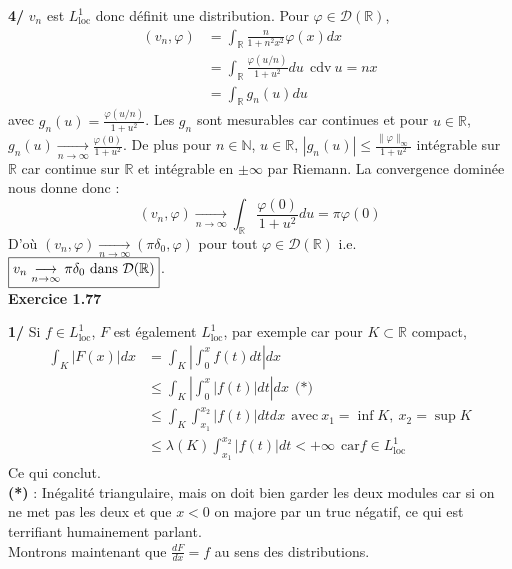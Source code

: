 \documentclass[a4paper,12pt]{article}
\begin{document}
\textbf{4/} $v_n$ est $L^1_{\text{loc}}$ donc définit une distribution. Pour $\varphi \in \mathcal{D}(\mathbb{R})$,
\begin{align*}
     (v_n, \varphi) & = \int_{\mathbb{R}} \frac{n}{1+n^2 x^2} \varphi(x) dx \\
     & = \int_{\mathbb{R}}  \frac{\varphi(u/n)}{1+u^2} du \ \ \text{cdv} \ u=nx \\ 
     & = \int_{\mathbb{R}} g_n(u) du
\end{align*}
avec $g_n(u) = \frac{\varphi(u/n)}{1+u^2}$. Les $g_n$ sont mesurables car continues et pour $u \in \mathbb{R}$, $g_n(u) \underset{n \to \infty}{\longrightarrow} \frac{\varphi(0)}{1+u^2}$. De plus pour $n \in \mathbb{N}$, $u \in \mathbb{R}$, $|g_n(u)| \leq \frac{\| \varphi \|_{\infty}}{1+u^2}$ intégrable sur $\mathbb{R}$ car continue sur $\mathbb{R}$ et intégrable en $\pm \infty$ par Riemann. La convergence dominée nous donne donc :
$$\boxed{(v_n, \varphi) \underset{n \to \infty}{\longrightarrow} \int_{\mathbb{R}} \frac{\varphi(0)}{1+u^2} du  = \pi \varphi(0)}$$
D'où $(v_n, \varphi) \underset{n \to \infty}{\longrightarrow} (\pi \delta_0, \varphi)$ pour tout $\varphi \in \mathcal{D}(\mathbb{R})$ i.e. $\boxed{v_n \underset{n \to \infty}{\longrightarrow} \pi \delta_0$ dans $\mathcal{D}(\mathbb{R)}}$. \\

\textbf{Exercice 1.77}

\textbf{1/} Si $f \in L^1_{\text{loc}}$, $F$ est également $L^1_{\text{loc}}$, par exemple car pour $K \subset \mathbb{R}$ compact,
\begin{align*}
     \int_K |F(x)| dx  & = \int_K \left| \int_{0}^x f(t)dt \right| dx \\
     & \leq \int_K \left| \int_0^x |f(t)| dt \right| dx \ \ \textbf{(*)} \\
     & \leq  \int_K \int_{x_1}^{x_2} |f(t)| dt dx \ \ \text{avec} \  x_1 = \inf K, \ x_2 = \sup K \\
     & \boxed{\leq \lambda(K) \int_{x_1}^{x_2} |f(t)| dt < + \infty} \ \ \text{car} f\in L^1_{\text{loc}}
\end{align*}
Ce qui conclut. \\

\textbf{(*)} : Inégalité triangulaire, mais on doit bien garder les deux modules car si on ne met pas les deux et que $x<0$ on majore par un truc négatif, ce qui est terrifiant humainement parlant. \\

Montrons maintenant que $\frac{dF}{dx} = f$ au sens des distributions.
\end{document}
